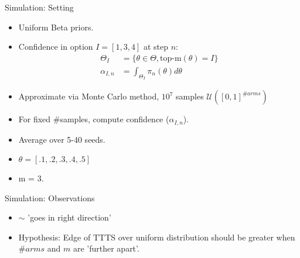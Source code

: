 \documentclass{beamer}
\begin{document}
\begin{frame}{Simulation: Setting}
    \begin{itemize}
        \item Uniform Beta priors.
        \item Confidence in option $I = [1,3,4]$ at step $n$:
        \begin{align}
            \Theta_I &= \{\theta \in \Theta, \text{top-m}(\theta) = I\} \\
            \alpha_{I, n} &= \int_{\Theta_I} \pi_n(\theta) d\theta
        \end{align}
        \item Approximate via Monte Carlo method, $10^7$ samples $\mathcal{U}([0, 1]^{\#arms})$
        \item For fixed \#samples, compute confidence ($\alpha_{I, n}$).
        \item Average over 5-40 seeds.
        \item $\theta = [.1, .2, .3, .4, .5]$
        \item m = 3.
    \end{itemize} 
\end{frame}

\begin{frame}{Simulation: Observations}
    \begin{itemize}
        \item $\sim$ 'goes in right direction'
        \item Hypothesis: Edge of TTTS over uniform distribution should be greater when $\#arms$ and $m$ are 'further apart'.
    \end{itemize} 
\end{frame}
\end{document}

